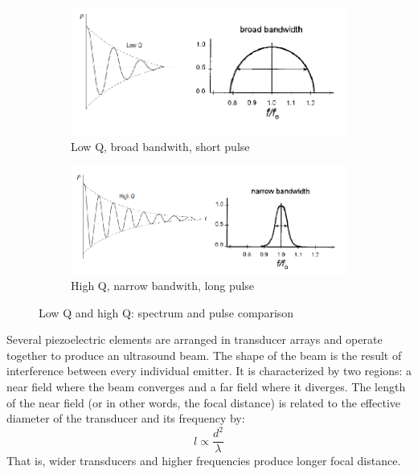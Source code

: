 \documentclass[11pt]{article} %
\begin{document}
	\begin{figure}[h]
	\centering
		\begin{subfigure}{0.49\textwidth}
		\centering
		\includegraphics[width=\textwidth]{figuras/lowq.png}
		\caption{Low Q, broad bandwith, short pulse}
		\end{subfigure}
		\centering
		\begin{subfigure}{0.49\textwidth}
		\centering
		\includegraphics[width=\textwidth]{figuras/highq.png}
		\caption{High Q, narrow bandwith, long pulse}
		\end{subfigure}	
	\caption{Low Q and high Q: spectrum and pulse comparison\cite{bushberg}\cite{farr}}	
	\end{figure}

	
	Several piezoelectric elements are arranged in transducer arrays and operate together to produce an ultrasound beam. The shape of the beam is the result of interference between every individual emitter. It is characterized by two regions: a near field where the beam converges and a far field where it diverges. The length of the near field (or in other words, the focal distance) is related to the effective diameter of the transducer and its frequency by: \[ l \propto \frac{d^2}{\lambda} \] That is, wider transducers and higher frequencies produce longer focal distance.

	
\end{document}
